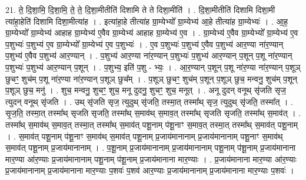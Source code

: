 \documentclass[17pt]{extarticle}
\begin{document}
21. ते॒ दि॒शा॒मि॒ दि॒शा॒मि॒ ते॒ ते॒ दि॒शा॒मीतीति॑ दिशामि ते ते दिशा॒मीति॑ । . दि॒शा॒मीतीति॑ दिशामि दिशा॒मी त्या॑हा॒हेति॑ दिशामि दिशा॒मीत्या॑ह । . इत्या॑हा॒हे तीत्या॑ह ग्रा॒म्येभ्यो᳚ ग्रा॒म्येभ्य॑ आ॒हे तीत्या॑ह ग्रा॒म्येभ्यः॑ । . आ॒ह॒ ग्रा॒म्येभ्यो᳚ ग्रा॒म्येभ्य॑ आहाह ग्रा॒म्येभ्य॑ ए॒वैव ग्रा॒म्येभ्य॑ आहाह ग्रा॒म्येभ्य॑ ए॒व । . ग्रा॒म्येभ्य॑ ए॒वैव ग्रा॒म्येभ्यो᳚ ग्रा॒म्येभ्य॑ ए॒व प॒शुभ्यः॑ प॒शुभ्य॑ ए॒व ग्रा॒म्येभ्यो᳚ ग्रा॒म्येभ्य॑ ए॒व प॒शुभ्यः॑ । . ए॒व प॒शुभ्यः॑ प॒शुभ्य॑ ए॒वैव प॒शुभ्य॑ आर॒ण्या ना॑र॒ण्यान् प॒शुभ्य॑ ए॒वैव प॒शुभ्य॑ आर॒ण्यान् । . प॒शुभ्य॑ आर॒ण्या ना॑र॒ण्यान् प॒शुभ्यः॑ प॒शुभ्य॑ आर॒ण्यान् प॒शून् प॒शू ना॑र॒ण्यान् प॒शुभ्यः॑ प॒शुभ्य॑ आर॒ण्यान् प॒शून् । . प॒शुभ्य॒ इति॑ प॒शु - भ्यः॒ । . आ॒र॒ण्यान् प॒शून् प॒शू ना॑र॒ण्या ना॑र॒ण्यान् प॒शूञ् छुचꣳ॒॒ शुच॑म् प॒शू ना॑र॒ण्या ना॑र॒ण्यान् प॒शूञ् छुच᳚म् । . प॒शूञ् छुचꣳ॒॒ शुच॑म् प॒शून् प॒शूञ् छुच॒ मन्वनु॒ शुच॑म् प॒शून् प॒शूञ् छुच॒ मनु॑ । . शुच॒ मन्वनु॒ शुचꣳ॒॒ शुच॒ मनू दुदनु॒ शुचꣳ॒॒ शुच॒ मनूत् । . अनू दुदन् वनूथ् सृ॑जति सृज॒ त्युदन् वनूथ् सृ॑जति । . उथ् सृ॑जति सृज॒ त्युदुथ् सृ॑जति॒ तस्मा॒त् तस्मा᳚थ् सृज॒ त्युदुथ् सृ॑जति॒ तस्मा᳚त् । . सृ॒ज॒ति॒ तस्मा॒त् तस्मा᳚थ् सृजति सृजति॒ तस्मा᳚थ् स॒माव॑थ् स॒माव॒त् तस्मा᳚थ् सृजति सृजति॒ तस्मा᳚थ् स॒माव॑त् । . तस्मा᳚थ् स॒माव॑थ् स॒माव॒त् तस्मा॒त् तस्मा᳚थ् स॒माव॑त् पशू॒नाम् प॑शू॒नाꣳ स॒माव॒त् तस्मा॒त् तस्मा᳚थ् स॒माव॑त् पशू॒नाम् । . स॒माव॑त् पशू॒नाम् प॑शू॒नाꣳ स॒माव॑थ् स॒माव॑त् पशू॒नाम् प्र॒जाय॑मानानाम् प्र॒जाय॑मानानाम् पशू॒नाꣳ स॒माव॑थ् स॒माव॑त् पशू॒नाम् प्र॒जाय॑मानानाम् । . प॒शू॒नाम् प्र॒जाय॑मानानाम् प्र॒जाय॑मानानाम् पशू॒नाम् प॑शू॒नाम् प्र॒जाय॑मानाना मार॒ण्या आ॑र॒ण्याः प्र॒जाय॑मानानाम् पशू॒नाम् प॑शू॒नाम् प्र॒जाय॑मानाना मार॒ण्याः । . प्र॒जाय॑मानाना मार॒ण्या आ॑र॒ण्याः प्र॒जाय॑मानानाम् प्र॒जाय॑मानाना मार॒ण्याः प॒शवः॑ प॒शव॑ आर॒ण्याः प्र॒जाय॑मानानाम् प्र॒जाय॑मानाना मार॒ण्याः प॒शवः॑ । \newline
\end{document}
